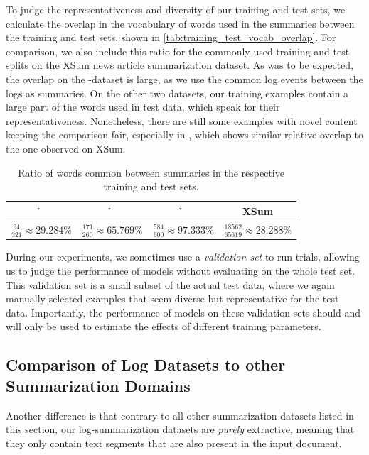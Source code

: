 To judge the representativeness and diversity of our training and test sets,
we calculate the overlap in the vocabulary of words used in the summaries between the training and test sets,
shown in \autoref{tab:training_test_vocab_overlap}.
For comparison, we also include this ratio for the commonly used training and test splits
on the XSum news article summarization dataset.
As was to be expected, the overlap on the \telco{}-dataset is large,
as we use the common log events between the logs as summaries.
On the other two datasets, our training examples contain a large part of the words used in test data,
which speak for their representativeness.
Nonetheless, there are still some examples with novel content keeping the comparison fair,
especially in \logsummary{}, which shows similar relative overlap to the one observed on XSum.

\begin{table}[htbp]
\centering
\footnotesize
\begin{tabular}{cccc}
\h{\logsummary{}}                   & \h{\hadoop{}}                        & \h{\telco{}}                         & \h{XSum}\\
\midrule
\(\frac{94}{321} \approx 29.284\%\) & \(\frac{171}{260} \approx 65.769\%\) & \(\frac{584}{600} \approx 97.333\%\) & \(\frac{18562}{65619} \approx 28.288\%\)
\end{tabular}
\caption{Ratio of words common between summaries in the respective training and test sets.}
\label{tab:training_test_vocab_overlap}
\end{table}

During our experiments, we sometimes use a \emph{validation set} to run trials,
allowing us to judge the performance of models without evaluating on the whole test set.
This validation set is a small subset of the actual test data,
where we again manually selected examples that seem diverse but representative for the test data.
Importantly, the performance of models on these validation sets
should and will only be used to estimate the effects of different training parameters.

\subsection{Comparison of Log Datasets to other Summarization Domains}\label{subsec:other_domains_vs_log_datasets}

Another difference is
that contrary to all other summarization datasets listed in this section,
our log-summarization datasets are \emph{purely} extractive,
meaning that they only contain text segments that are also present in the input document.


